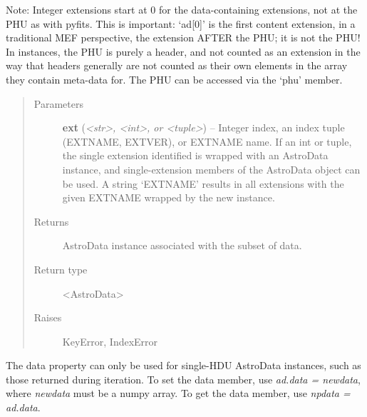 \documentclass[letterpaper,10pt,english]{sphinxmanual}
\begin{document}
\begin{fulllineitems}
\begin{fulllineitems}
Note: Integer extensions start at 0 for the data-containing 
extensions, not at the PHU as with pyfits.  This is important:
`ad{[}0{]}' is the first content extension, in a traditional MEF 
perspective, the extension AFTER the PHU; it is not the PHU!  In
 instances, the PHU is purely a header, and not counted
as an extension in the way that headers generally are not counted
as their own elements in the array they contain meta-data for.
The PHU can be accessed via the `phu' member.
\begin{quote}\begin{description}
\item[{Parameters}] \leavevmode
\textbf{ext} (\emph{\textless{}str\textgreater{}, \textless{}int\textgreater{}, or \textless{}tuple\textgreater{}}) -- Integer index, an index tuple (EXTNAME, EXTVER),
or EXTNAME name. If an int or tuple, the single
extension identified is wrapped with an AstroData instance,
and single-extension members of the AstroData object can 
be used. A string `EXTNAME' results in all extensions with 
the given EXTNAME wrapped by the new instance.

\item[{Returns}] \leavevmode
AstroData instance associated with the subset of data.

\item[{Return type}] \leavevmode
\textless{}AstroData\textgreater{}

\item[{Raises }] \leavevmode
KeyError, IndexError

\end{description}\end{quote}

\end{fulllineitems}


\begin{fulllineitems}
\label{astro_class:astrodata.AstroData.AstroData.data}
The data property can only be used for single-HDU AstroData
instances, such as those returned during iteration. To set the 
data member, use \emph{ad.data = newdata}, where \emph{newdata} must be a 
numpy array. To get the data member, use \emph{npdata = ad.data}.


\end{fulllineitems}
\end{fulllineitems}
\end{document}
